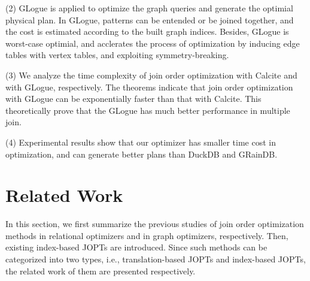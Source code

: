 \documentclass[sigconf, nonacm]{acmart}
\begin{document}
(2) GLogue is applied to optimize the graph queries and generate the optimial physical plan.
In GLogue, patterns can be entended or be joined together, and the cost is estimated according to the built graph indices.
Besides, GLogue is worst-case optimial, and acclerates the process of optimization by inducing edge tables with vertex tables, and exploiting symmetry-breaking.

(3) We analyze the time complexity of join order optimization with Calcite and with GLogue, respectively.
The theorems indicate that join order optimization with GLogue can be exponentially faster than that with Calcite.
This theoretically prove that the GLogue has much better performance in multiple join.

(4) Experimental results show that our optimizer has smaller time cost in optimization, and can generate better plans than DuckDB and GRainDB.


\section{Related Work}
\label{sec:related-work}
In this section, we first summarize the previous studies of join order optimization methods in relational optimizers and in graph optimizers, respectively.
Then, existing index-based JOPTs are introduced.
Since such methods can be categorized into two types, i.e., translation-based JOPTs and index-based JOPTs, the related work of them are presented respectively.
\end{document}
